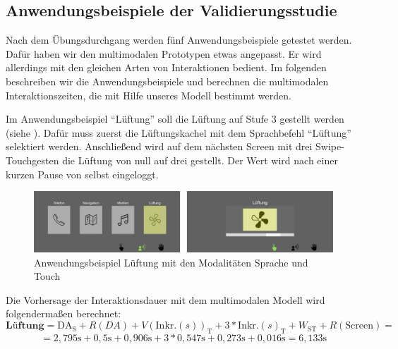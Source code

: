 \subsection[Anwendungsbeispiele]{Anwendungsbeispiele der Validierungsstudie}
Nach dem Übungsdurchgang werden fünf Anwendungsbeispiele getestet werden. 
Dafür haben wir den multimodalen Prototypen etwas angepasst. 
Er wird allerdings mit den gleichen Arten von Interaktionen bedient. 
Im folgenden beschreiben wir die Anwendungsbeispiele und berechnen die multimodalen Interaktionszeiten, die mit Hilfe unseres Modell bestimmt werden.
 
Im Anwendungsbeispiel "`Lüftung"' soll die Lüftung auf Stufe 3 gestellt werden (siehe ). 
Dafür muss zuerst die Lüftungskachel mit dem Sprachbefehl "`Lüftung"' selektiert werden. 
Anschließend wird auf dem nächsten Screen mit drei Swipe-Touchgesten die Lüftung von null auf drei gestellt. 
Der Wert wird nach einer kurzen Pause von selbst eingeloggt.  
\begin{figure}[ht]
	\centering
		\includegraphics[width=1\textwidth]{img/UseCases_Eval_Luft.jpg}
	\caption[]{Anwendungsbeispiel Lüftung mit den Modalitäten Sprache und Touch}
	\label{fig:UseCasesEvalLuft}
\end{figure}
Die Vorhersage der Interaktionsdauer mit dem multimodalen Modell wird folgendermaßen berechnet:
\[
\textbf{Lüftung} = \text{DA}_\text{S} + R(DA) + V(\text{Inkr.} (s))_\text{T} + 3*\text{Inkr.} (s)_\text{T}  + W_\text{ST} + R(\text{Screen}) =
\]
\[
= 2,795\text{s} + 0,5\text{s} + 0,906\text{s} + 3*0,547\text{s} +  0,273\text{s} + 0,016\text{s} = 6,133\text{s}
\]

